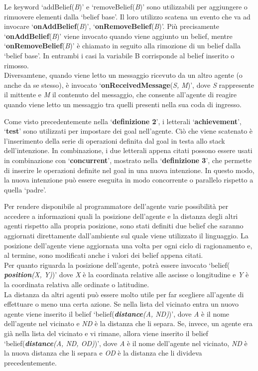 \medskip
Le keyword `addBelief(\textit{B})' e `removeBelief(\textit{B})' sono utilizzabili per aggiungere o rimuovere elementi dalla `belief base'. Il loro utilizzo scatena un evento che va ad invocare `\textbf{onAddBelief}(\textit{B})', `\textbf{onRemoveBelief}(\textit{B})'. Pi\`u precisamente `\textbf{onAddBelief}(\textit{B})' viene invocato quando viene aggiunto un belief, mentre `\textbf{onRemoveBelief}(\textit{B})' \`e chiamato in seguito alla rimozione di un belief dalla `belief base'. In entrambi i casi la variabile B corrisponde al belief inserito o rimosso.
\\
Diversamtene, quando viene letto un messaggio ricevuto da un altro agente (o anche da se stesso), \`e invocato `\textbf{onReceivedMessage}(\textit{S, M})', dove \textit{S} rappresente il mittente e \textit{M} il contenuto del messaggio, che consente all'agente di reagire quando viene letto un messaggio tra quelli presenti nella sua coda di ingresso.

\medskip
Come visto precedentemente nella `\textbf{definizione 2}', i letterali `\textbf{achievement}', `\textbf{test}' sono utilizzati per impostare dei goal nell'agente. Ci\`o che viene scatenato  \`e l'inserimento della serie di operazioni definita dal goal in testa allo stack dell'intenzione.
In combinazione, i due letterali appena citati possono essere usati in combinazione con `\textbf{concurrent}', mostrato nella `\textbf{definizione 3}', che permette di inserire le operazioni definite nel goal in una nuova intenzione. In questo modo, la nuova intenzione pu\`o essere eseguita in modo concorrente o parallelo rispetto a quella `padre'.

\medskip
Per rendere disponibile al programmatore dell'agente varie possibilit\`a per accedere a informazioni quali la posizione dell'agente e la distanza degli altri agenti rispetto alla propria posizione, sono stati definiti due belief che saranno aggiornati direttamente dall'ambiente sul quale viene utilizzato il linguaggio. La posizione dell'agente viene aggiornata una volta per ogni ciclo di ragionamento e, al termine, sono modificati anche i valori dei belief appena citati. 
\\
Per quanto riguarda la posizione dell'agente, potr\`a essere invocato `belief( \textit{\textbf{position}(X, Y)})' dove \textit{X} \`e la coordinata relative alle ascisse o longitudine e \textit{Y} \`e la coordinata relativa alle ordinate o latitudine.
\\
La distanza da altri agenti pu\`o essere molto utile per far scegliere all'agente di effettuare o meno una certa azione. Se nella lista del vicinato entra un nuovo agente viene inserito il belief `belief(\textit{\textbf{distance}(A, ND)})', dove \textit{A} \`e il nome dell'agente nel vicinato e \textit{ND} \`e la distanza che li separa. Se, invece, un agente era gi\`a nella lista del vicinato e vi rimane, allora viene inserito il belief `belief(\textit{\textbf{distance}(A, ND, OD)})', dove \textit{A} \`e il nome dell'agente nel vicinato, \textit{ND} \`e la nuova distanza che li separa e \textit{OD} \`e la distanza che li divideva precedentemente.


